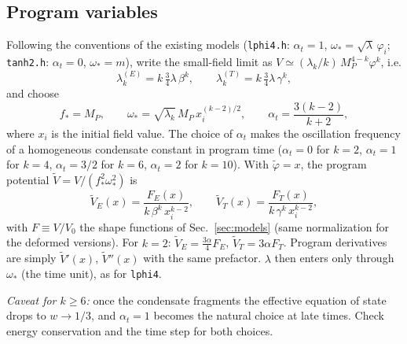 \documentclass[11pt,a4paper]{article}
\newcommand{\MP}{M_P}
\newcommand{\aatt}{\alpha}
\newcommand{\at}{\alpha_t}
\begin{document}
\subsection{Program variables}
Following the conventions of the existing models (\texttt{lphi4.h}: $\at=1$, $\omega_*=\sqrt\lambda\,\varphi_i$; \texttt{tanh2.h}: $\at=0$, $\omega_*=m$), write the small-field limit as $V\simeq(\lambda_k/k)\,\MP^{4-k}\varphi^k$, i.e.
\begin{equation}
\lambda_k^{(E)} = k\,\tfrac34\lambda\,\beta^k,\qquad \lambda_k^{(T)} = k\,\tfrac34\lambda\,\gamma^k,
\end{equation}
and choose
\begin{equation}
f_* = \MP,\qquad
\omega_* = \sqrt{\lambda_k}\,\MP\,x_i^{(k-2)/2},\qquad
\at = \frac{3(k-2)}{k+2},
\end{equation}
where $x_i$ is the initial field value. The choice of $\at$ makes the oscillation frequency of a homogeneous condensate constant in program time ($\at=0$ for $k=2$, $\at=1$ for $k=4$, $\at=3/2$ for $k=6$, $\at=2$ for $k=10$). With $\tilde\varphi=x$, the program potential $\tilde V=V/(f_*^2\omega_*^2)$ is
\begin{equation}
\tilde V_{E}(x) = \frac{F_E(x)}{k\,\beta^k\,x_i^{k-2}},\qquad
\tilde V_{T}(x) = \frac{F_T(x)}{k\,\gamma^k\,x_i^{k-2}},
\end{equation}
with $F\equiv V/V_0$ the shape functions of Sec.~\ref{sec:models} (same normalization for the deformed versions). For $k=2$: $\tilde V_E = \tfrac{3\aatt}{4}F_E$, $\tilde V_T = 3\aatt F_T$. Program derivatives are simply $\tilde V'(x)$, $\tilde V''(x)$ with the same prefactor. $\lambda$ then enters only through $\omega_*$ (the time unit), as for \texttt{lphi4}.

\emph{Caveat for $k\ge6$:} once the condensate fragments the effective equation of state drops to $w\to1/3$, and $\at=1$ becomes the natural choice at late times. Check energy conservation and the time step for both choices.
\end{document}
